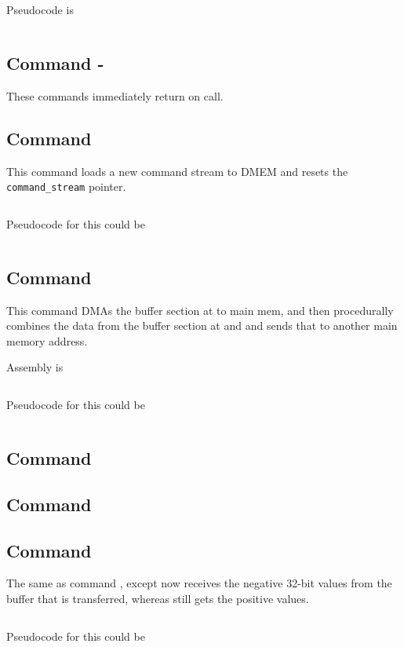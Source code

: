 Pseudocode is

\inputminted{c}{../ucode/command_8.c}

\subsection{Command  - }
These commands immediately return on call.
\subsection{Command }
This command loads a new command stream to DMEM and resets the \texttt{command_stream} pointer. 

\inputminted[fontsize=\small]{asm}{../ucode/command_d.asm}

Pseudocode for this could be 

\inputminted{c}{../ucode/command_d.c}

\subsection{Command }
This command DMAs the buffer section at  to main mem, and then procedurally combines the data from the buffer section at  and  and sends that to another main memory address.

Assembly is 

\inputminted[fontsize=\small]{asm}{../ucode/command_e.asm}

Pseudocode for this could be 

\inputminted{c}{../ucode/command_e.c}


\subsection{Command }
\subsection{Command }
\subsection{Command }

The same as command , except now  receives the negative 32-bit values from the buffer that is transferred, whereas  still gets the positive values.

\inputminted[fontsize=\small]{asm}{../ucode/command_11.asm}

Pseudocode for this could be 

\inputminted{c}{../ucode/command_11.c}
